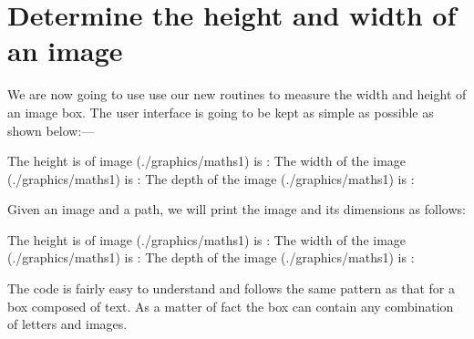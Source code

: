 \newlength{\imageh}
\newlength{\imaged}
\newlength{\imagew}

\newcommand{\setimageh}[1]{
 \settoheight{\imageh}{\usebox{#1}}
}

\newcommand{\setimagew}[1]{
 \settowidth{\imagew}{\usebox{#1}}
}

\newcommand{\setimaged}[1]{
 \settowidth{\imaged}{\usebox{#1}}
}


\newcommand{\ImageDimensions}[1]{
   \newsavebox{\Image}
   \savebox{\Image}{\texttt{[image: \#1]}}
  {\hfill\usebox{\Image}\hfill}
  \setimageh{\Image}
  \setimagew{\Image}
  \setimaged{\Image}
   {\break\footnotesize
     {\raggedright 
      The height is of image (#1) is : \the\imageh\break
     The width of the  image (#1) is : \the\imagew\break
     The depth of the  image (#1) is : \the\imaged\break }}
}


\section*{Determine the height and width of an image}
We are now going to use use our new routines to measure the width and height of an image box. The user interface
is going to be kept as simple as possible as shown below:---

\begin{teX}
\ImageDimensions{./graphics/maths1}
\end{teX}

Given an image and a path, we will print the image and its dimensions as follows:
\medskip

\ImageDimensions{./graphics/maths1}

\bigskip

The code is fairly easy to understand and follows the same pattern as that for a box composed of
text. As a matter of fact the box can contain any combination of letters and images.

\begin{teX}
\newlength{\imageh}
\newlength{\imaged}
\newlength{\imagew}

\newcommand{\setimageh}[1]{
 \settoheight{\imageh}{\usebox{#1}}
}

\newcommand{\setimagew}[1]{
 \settowidth{\imagew}{\usebox{#1}}
}

\newcommand{\setimaged}[1]{
 \settowidth{\imaged}{\usebox{#1}}
}


\newcommand{\ImageDimensions}[1]{
   \newsavebox{\Image}
   \savebox{\Image}{\texttt{[image: \#1]}}
  {\hss\usebox{\Image}\hss}
  \setimageh{\Image}
  \setimagew{\Image}
   {\break\footnotesize
     {\raggedright 
      The height is of image (#1) is : \the\imageh\break
     The width of the  image (#1) is : \the\imagew\break
     The depth of the  image (#1) is : \the\imaged\par}}
}
\end{teX}


